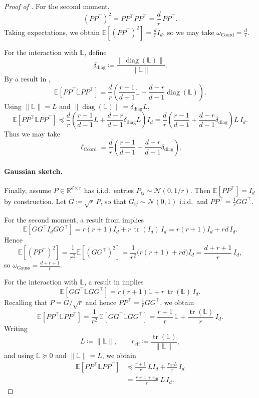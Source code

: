 \documentclass[10pt]{article}
\newcommand{\tr}{\operatorname{tr}}
\newcommand{\diag}{\operatorname{diag}}
\newcommand{\E}{\mathbb{E}}
\newcommand{\R}{\mathbb{R}}
\newcommand{\Lmat}{\mathbb{L}}
\begin{document}
\begin{proof}[Proof of ]
For the second moment, 
\[
(PP^\top)^2
=
PP^\top PP^\top
=
\frac{d}{r}\,PP^\top.
\]
Taking expectations, we obtain
\(\E[(PP^\top)^2]=\frac{d}{r}I_d\), so we may take \(\omega_{\mathrm{Coord}}=\frac{d}{r}\).

For the interaction with \(\Lmat\), define
\[
\delta_{\mathrm{diag}}\coloneqq\frac{\|\diag(\Lmat)\|}{\|\Lmat\|}.
\]
By a result in \cite{flynn2024},
\[
\E[PP^\top \Lmat PP^\top]
=
\frac{d}{r}\left(\frac{r-1}{d-1}\Lmat+\frac{d-r}{d-1}\diag(\Lmat)\right).
\]
Using \(\|\Lmat\|=L\) and \(\|\diag(\Lmat)\|=\delta_{\mathrm{diag}}L\),
\[
\E[PP^\top \Lmat PP^\top]
\preceq
\frac{d}{r}\left(\frac{r-1}{d-1}L+\frac{d-r}{d-1}\delta_{\mathrm{diag}}L\right)I_d
=
\frac{d}{r}\left(\frac{r-1}{d-1}+\frac{d-r}{d-1}\delta_{\mathrm{diag}}\right)L\,I_d.
\]
Thus we may take
\[
\ell_{\mathrm{Coord}}
=
\frac{d}{r}\left(\frac{r-1}{d-1}+\frac{d-r}{d-1}\delta_{\mathrm{diag}}\right).
\]



\paragraph{Gaussian sketch.}
Finally, assume \(P\in\R^{d\times r}\) has i.i.d.\ entries
\(P_{ij}\sim \mathcal{N}(0,1/r)\).
Then \(\E[PP^\top]=I_d\) by construction.
Let \(G\coloneqq\sqrt{r}\,P\), so that \(G_{ij}\sim\mathcal{N}(0,1)\) i.i.d.\ and
\(PP^\top=\frac{1}{r}GG^\top\).

For the second moment, a result from \cite{flynn2024} implies
\[
\E[GG^\top I_d GG^\top]=r(r+1)I_d+r\,\tr(I_d)\,I_d
= r(r+1)I_d + rd\,I_d.
\]
Hence
\[
\E[(PP^\top)^2]
=
\frac{1}{r^2}\E[(GG^\top)^2]
=
\frac{1}{r^2}\bigl(r(r+1)+rd\bigr)I_d
=
\frac{d+r+1}{r}\,I_d,
\]
so 
\(\omega_{\mathrm{Gauss}}=\frac{d+r+1}{r}\).

For the interaction with \(\Lmat\), a result in \cite{flynn2024} implies
\[
\E[GG^\top \Lmat GG^\top]=r(r+1)\Lmat+r\,\tr(\Lmat)\,I_d.
\]
Recalling that \(P=G/\sqrt{r}\) and hence \(PP^\top = \frac{1}{r} GG^\top\), we obtain
\[
\E[PP^\top \Lmat PP^\top]
=
\frac{1}{r^2}\,\E[GG^\top \Lmat GG^\top]
=
\frac{r+1}{r}\,\Lmat+\frac{\tr(\Lmat)}{r}\,I_d.
\]
Writing
\[
L\coloneqq\|\Lmat\|,
\qquad
r_{\mathrm{eff}}\coloneqq\frac{\tr(\Lmat)}{\|\Lmat\|},
\]
and using \(\Lmat\succeq 0\) and \(\|\Lmat\|=L\), we obtain
\begin{align*}
\E[PP^\top \Lmat PP^\top]
&\preceq
\frac{r+1}{r}\,L I_d+\frac{r_{\mathrm{eff}}L}{r}\,I_d \\
&=
\frac{r+1+r_{\mathrm{eff}}}{r}\,L\,I_d.
\end{align*}


\end{proof}
\end{document}
